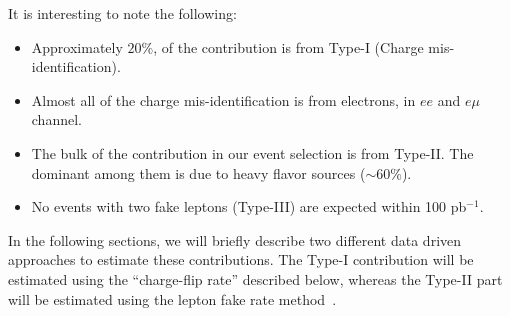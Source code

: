 It is interesting to note the following:
\begin{itemize}
\item Approximately $20 \%$, of the contribution is from Type-I (Charge mis-identification).
\item Almost all of the charge mis-identification is from electrons, in $ee$ and $e\mu$ channel.
\item The bulk of the \ttbar contribution in our event selection is from Type-II. The dominant among them 
is due to heavy flavor sources ($\sim 60 \%$).
\item No events with two fake leptons (Type-III) are expected within 100 pb$^{-1}$.
\end{itemize} 

In the following sections, we will briefly describe two different data driven approaches to 
estimate these contributions. The Type-I contribution will be estimated using the ``charge-flip rate'' described below, 
whereas the Type-II part will be estimated using the lepton fake rate method~\cite{fakelep}.



